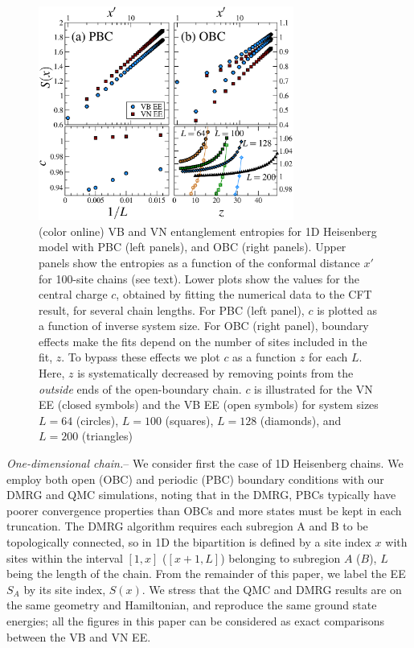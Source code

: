\documentclass[prl,aps,twocolumn,floatfix,amsmath,amssymb,superscriptaddress,tightenlines]{revtex4}
\begin{document}
\begin{figure} {
\includegraphics[width=3.3in]{4-panelFIG1.eps} \caption{(color online) VB
and VN entanglement entropies for 1D Heisenberg model with PBC (left
panels), and OBC (right panels). Upper panels show the entropies as a
function of the conformal distance $x'$ for 100-site chains (see text).
Lower plots show the values for the central charge $c$, obtained by
fitting the numerical data to the CFT result, for several chain lengths.
For PBC (left panel), $c$ is plotted as a function of inverse system size.
For OBC (right panel), boundary effects make the fits depend on the number
of sites included in the fit, $z$. To bypass these effects we plot $c$ as
a function $z$ for each $L$. Here, $z$ is systematically decreased by
removing points from the {\it outside} ends of the open-boundary chain.
$c$ is illustrated for the VN EE (closed symbols) and the VB EE (open
symbols) for system sizes $L=64$ (circles), $L=100$ (squares), $L=128$
(diamonds), and $L=200$ (triangles) \label{1D}}} \end{figure}

{\it One-dimensional chain.}-- We consider first the case of 1D Heisenberg
chains. We employ both open (OBC) and periodic (PBC) boundary conditions
with our DMRG and QMC simulations, noting that in the DMRG, PBCs typically
have poorer convergence properties than OBCs and more states must be kept
in each truncation.  The DMRG algorithm requires each subregion A and B to
be topologically connected, so in 1D the bipartition is defined by a site
index $x$ with sites within the interval $[1,x]$ ($[x+1,L]$) belonging to
subregion $A$ ($B$), $L$ being the length of the chain.  From the
remainder of this paper, we label the EE $S_A$ by its site index, $S(x)$.
We stress that the QMC and DMRG results are on the same geometry and
Hamiltonian, and reproduce the same ground state energies; all the figures
in this paper can be considered as exact comparisons between the VB and VN
EE. 
\end{document}
